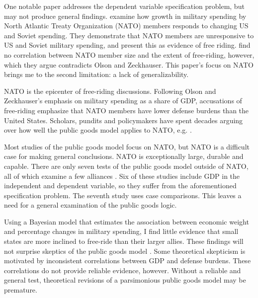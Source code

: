 \documentclass[12pt]{article}
\begin{document}
One notable paper addresses the dependent variable specification problem, but may not produce general findings. 
\citet{PluemperNeumayer2015} examine how growth in military spending by North Atlantic Treaty Organization (NATO) members responds to changing US and Soviet spending.
They demonstrate that NATO members are unresponsive to US and Soviet military spending, and present this as evidence of free riding.
\citet{PluemperNeumayer2015} find no correlation between NATO member size and the extent of free-riding, however, which they argue contradicts Olson and Zeckhauser.
This paper's focus on NATO brings me to the second limitation: a lack of generalizability. 


NATO is the epicenter of free-riding discussions. 
Following Olson and Zeckhauser's emphasis on military spending as a share of GDP, accusations of free-riding emphasize that NATO members have lower defense burdens than the United States. 
Scholars, pundits and policymakers have spent decades arguing over how well the public goods model applies to NATO, e.g. \citep{Pryor1968, SandlerForbes1980, Palmer1990, HiltonVhu1991, Boyer1993, GatesTerasawa1992, SandlerHartley2001, Lanoszka2015, PluemperNeumayer2015, KimSandler2019}.


Most studies of the public goods model focus on NATO, but NATO is a difficult case for making general conclusions. 
NATO is exceptionally large, durable and capable. 
There are only seven tests of the public goods model outside of NATO, all of which examine a few alliances \citep{Russett1970, Starr1974, Reisinger1983, Thies1987, ConybeareSandler1990, OnealWhatley1996, Siroky2012}. 
Six of these studies include GDP in the independent and dependent variable, so they suffer from the aforementioned specification problem.
The seventh study uses case comparisons.
This leaves a need for a general examination of the public goods logic. 



Using a Bayesian model that estimates the association between economic weight and percentage changes in military spending, I find little evidence that small states are more inclined to free-ride than their larger allies.
These findings will not surprise skeptics of the public goods model \citep{Palmer1990, GatesTerasawa1992, SandlerHartley2001, Norrlof2010, NiouZeigler2019}.
Some theoretical skepticism is motivated by inconsistent correlations between GDP and defense burdens. 
These correlations do not provide reliable evidence, however. 
Without a reliable and general test, theoretical revisions of a parsimonious public goods model may be premature.
\end{document}
